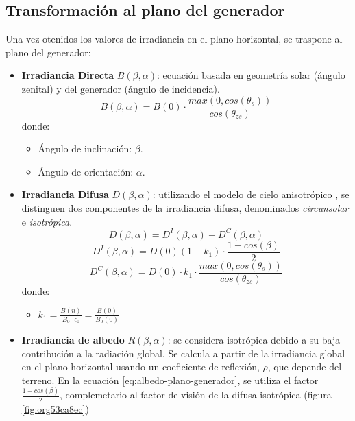 \subsection{Transformación al plano del generador}
\label{sec:orgdd4196b}
\label{subsec:transformación-plano-generador}
Una vez otenidos los valores de irradiancia en el plano horizontal, se traspone al plano del generador:
\begin{itemize}
\item \textbf{Irradiancia Directa} \(B(\beta ,\alpha)\): ecuación basada en geometría solar (ángulo zenital) y del generador (ángulo de incidencia).
\begin{equation}
B(\beta ,\alpha)=B(0)\cdot \frac{max(0,cos(\theta_s))}{cos(\theta_{zs})}
\label{eq:irradiancia-directa-plano-generador}
\end{equation}
donde:
\begin{itemize}
\item Ángulo de inclinación: \(\beta\).
\item Ángulo de orientación: \(\alpha\). 
\end{itemize}
\item \textbf{Irradiancia Difusa} \(D(\beta ,\alpha)\): utilizando el modelo de cielo anisotrópico \cite{Perpinan2023}, se distinguen dos componentes de la irradiancia difusa, denominados \emph{circunsolar} e \emph{isotrópica}.  
\begin{equation}
D(\beta ,\alpha)=D^I(\beta ,\alpha)+D^C(\beta ,\alpha)
\end{equation}
\begin{equation}
D^I(\beta ,\alpha)=D(0)(1-k_1)\cdot \frac{1+cos(\beta)}{2}
\end{equation}
\begin{equation}
D^C(\beta, \alpha)=D(0)\cdot k_1\cdot \frac{max(0,cos(\theta_s))}{cos(\theta_{zs})}
\end{equation}
donde:
\begin{itemize}
\item \(k_1=\frac{B(n)}{B_0\cdot \epsilon_0}=\frac{B(0)}{B_0(0)}\)
\end{itemize}
\item \textbf{Irradiancia de albedo} \(R(\beta ,\alpha)\): se considera isotrópica debido a su baja contribución a la radiación global. Se calcula a partir de la irradiancia global en el plano horizontal usando un coeficiente de reflexión, \(\rho\), que depende del terreno. En la ecuación \ref{eq:albedo-plano-generador}, se utiliza el factor \(\frac{1-cos(\beta)}{2}\), complemetario al factor de visión de la difusa isotrópica (figura \ref{fig:org53ca8ec})

\end{itemize}
